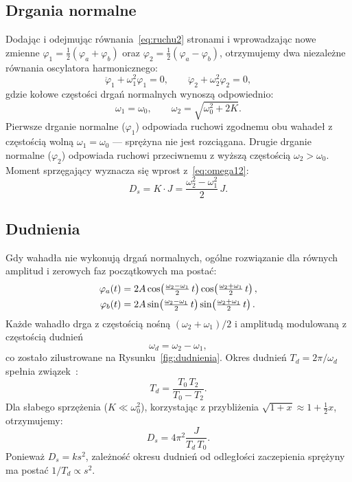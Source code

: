 \documentclass[12pt, a4paper]{article}
\begin{document}
\subsection{Drgania normalne}

Dodając i odejmując równania~\eqref{eq:ruchu2} stronami i wprowadzając
nowe zmienne $\varphi_1 = \tfrac{1}{2}(\varphi_a + \varphi_b)$
oraz $\varphi_2 = \tfrac{1}{2}(\varphi_a - \varphi_b)$, otrzymujemy
dwa niezależne równania oscylatora harmonicznego:
\begin{equation}
    \ddot{\varphi}_1 + \omega_1^2\varphi_1 = 0, \qquad
    \ddot{\varphi}_2 + \omega_2^2\varphi_2 = 0,
    \label{eq:normalne}
\end{equation}
gdzie kołowe częstości drgań normalnych wynoszą odpowiednio:
\begin{equation}
    \omega_1 = \omega_0, \qquad
    \omega_2 = \sqrt{\omega_0^2 + 2K}.
    \label{eq:omega12}
\end{equation}
Pierwsze drganie normalne ($\varphi_1$) odpowiada ruchowi zgodnemu obu wahadeł
z częstością wolną $\omega_1 = \omega_0$ --- sprężyna nie jest rozciągana.
Drugie drganie normalne ($\varphi_2$) odpowiada ruchowi przeciwnemu
z wyższą częstością $\omega_2 > \omega_0$.
Moment sprzęgający wyznacza się wprost z~\eqref{eq:omega12}:
\begin{equation}
    D_s = K \cdot J = \frac{\omega_2^2 - \omega_1^2}{2}\,J.
    \label{eq:Ds_metoda1}
\end{equation}

\subsection{Dudnienia}

Gdy wahadła nie wykonują drgań normalnych, ogólne rozwiązanie dla równych
amplitud i zerowych faz początkowych ma postać:
\begin{align}
    \varphi_a(t) &= 2A\cos\!\left(\tfrac{\omega_2-\omega_1}{2}\,t\right)
                    \cos\!\left(\tfrac{\omega_2+\omega_1}{2}\,t\right), \notag \\
    \varphi_b(t) &= 2A\sin\!\left(\tfrac{\omega_2-\omega_1}{2}\,t\right)
                    \sin\!\left(\tfrac{\omega_2+\omega_1}{2}\,t\right).
    \label{eq:dudnienia}
\end{align}
Każde wahadło drga z częstością nośną $(\omega_2+\omega_1)/2$
i amplitudą modulowaną z częstością dudnień
\begin{equation}
    \omega_d = \omega_2 - \omega_1,
    \label{eq:omegad}
\end{equation}
co zostało zilustrowane na Rysunku~\ref{fig:dudnienia}.
Okres dudnień $T_d = 2\pi/\omega_d$ spełnia związek~\cite{skrypt}:
\begin{equation}
    T_d = \frac{T_0\,T_2}{T_0 - T_2}.
    \label{eq:Td}
\end{equation}
Dla słabego sprzężenia ($K \ll \omega_0^2$), korzystając
z przybliżenia $\sqrt{1+x}\approx 1+\tfrac{1}{2}x$, otrzymujemy:
\begin{equation}
    D_s = 4\pi^2 \frac{J}{T_d\,T_0}.
    \label{eq:Ds_metoda2}
\end{equation}
Ponieważ $D_s = ks^2$, zależność okresu dudnień od odległości
zaczepienia sprężyny ma postać $1/T_d \propto s^2$.
\end{document}
